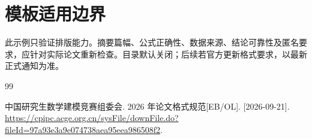 \section{模板适用边界}
此示例只验证排版能力。摘要篇幅、公式正确性、数据来源、结论可靠性及匿名要求，应针对实际论文重新检查。目录默认关闭；后续若官方更新格式要求，以最新正式通知为准。
\begin{thebibliography}{99}
\raggedright
{} 中国研究生数学建模竞赛组委会. 2026 年论文格式规范[EB/OL]. [2026-09-21].
\url{https://cpipc.acge.org.cn/sysFile/downFile.do?fileId=97a93e3a9e074738aea95eea986508f2}.
\end{thebibliography}
